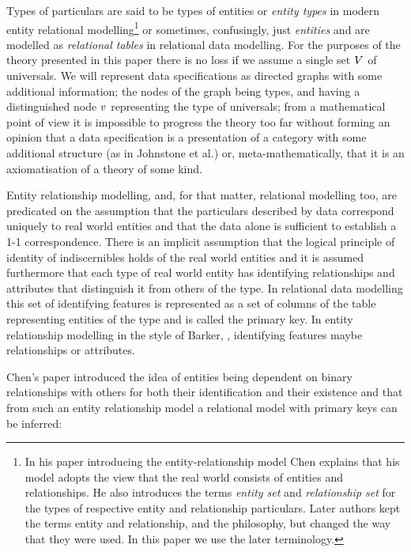 Types of particulars are said to be 
types of entities or \textit{entity types} in modern entity relational modelling\footnote{In  his paper  introducing the entity-relationship model Chen explains that his model adopts the view that the real world consists of entities and relationships. He also introduces the  terms \textit{entity set} and \textit{relationship set} for the types of respective entity and relationship particulars. Later authors kept the terms entity and relationship, and the philosophy, but changed the way that they were used. In this paper we use the later terminology.} or sometimes, confusingly, just \textit{entities}  and 
are modelled as \textit{relational tables} in relational data modelling. For the purposes of the theory presented in this paper there is no loss if we assume a single set $V$ of universals.  We will represent data specifications as directed graphs with 
some additional information; the nodes of the graph being types, and having a distinguished node $v$ representing the type of universals; from a mathematical point of view it is impossible to progress the theory too far without forming an opinion that a data specification is a presentation of a category with some additional structure 
(as in Johnstone et al.) or, meta-mathematically, that it is an axiomatisation of a theory of some kind. 


Entity relationship modelling, and, for that matter, relational modelling too, are 
predicated on the assumption that the particulars described by data 
correspond uniquely to real world entities and that the data 
alone is sufficient to establish a 1-1 correspondence. 
There is an implicit assumption that the logical principle of identity of 
indiscernibles holds of the real world entities and it is assumed furthermore 
that each type of real world entity has identifying relationships and attributes that distinguish it from  others of the type. 
In relational data modelling this set of identifying features is represented as a set of columns of the table representing entities of the type and is called the primary key.
In entity relationship modelling in the style of Barker, , identifying features maybe relationships or attributes.    
\fi

Chen's paper introduced the idea of entities being dependent on binary relationships 
with others for both their identification and their existence and that from such an entity relationship model a relational model with primary keys can be inferred:

